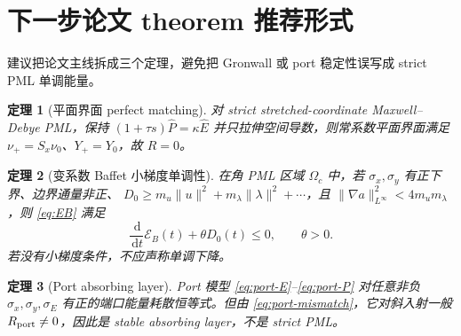 \documentclass[UTF8,a4paper,11pt]{ctexart}
\newtheorem{theorem}{定理}
\newcommand{\dd}{\,\mathrm d}
\newcommand{\sx}{\sigma_x}
\newcommand{\sy}{\sigma_y}
\newcommand{\Ecal}{\mathcal E}
\begin{document}
\section{下一步论文 theorem 推荐形式}

建议把论文主线拆成三个定理，避免把 Gronwall 或 port 稳定性误写成 strict PML
单调能量。

\begin{theorem}[平面界面 perfect matching]
对 strict stretched-coordinate Maxwell--Debye PML，保持
\((1+\tau s)\widehat P=\kappa\widehat E\) 并只拉伸空间导数，则常系数平面界面满足
\(\nu_+=S_x\nu_0\)、\(Y_+=Y_0\)，故 \(R=0\)。
\end{theorem}

\begin{theorem}[变系数 Baffet 小梯度单调性]
在角 PML 区域 \(\Omega_c\) 中，若 \(\sx,\sy\) 有正下界、边界通量非正、
\(D_0\ge m_u\|u\|^2+m_\lambda\|\lambda\|^2+\cdots\)，且
\(\|\nabla a\|_{L^\infty}^2<4m_um_\lambda\)，则 \eqref{eq:EB} 满足
\[
\frac{\dd}{\dd t}\Ecal_B(t)+\theta D_0(t)\le0,\qquad \theta>0.
\]
若没有小梯度条件，不应声称单调下降。
\end{theorem}

\begin{theorem}[Port absorbing layer]
Port 模型 \eqref{eq:port-E}--\eqref{eq:port-P} 对任意非负
\(\sx,\sy,\sigma_E\) 有正的端口能量耗散恒等式。但由
\eqref{eq:port-mismatch}，它对斜入射一般 \(R_{\rm port}\ne0\)，因此是 stable
absorbing layer，不是 strict PML。
\end{theorem}
\end{document}
